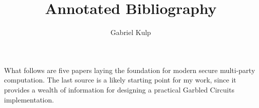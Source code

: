 \documentclass[12pt,letterpaper]{article}
\author{Gabriel Kulp}
\title{Annotated Bibliography}
\begin{document}
\maketitle

What follows are five papers laying the foundation for modern secure multi-party computation. The last source is a likely starting point for my work, since it provides a wealth of information for designing a practical Garbled Circuits implementation.

\nocite{YaoGC,FirstOT,FreeXOR,Fairplay,TinyGarble}
\printbibliography[heading=none]
\end{document}
